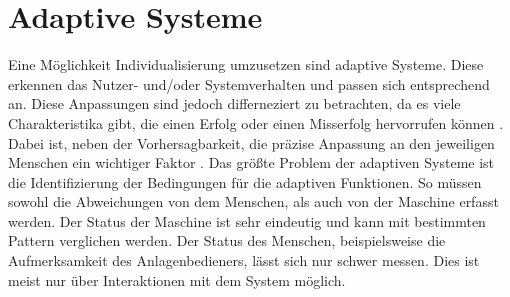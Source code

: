 \section{Adaptive Systeme}
\label{2:Adaptive-Systeme}
Eine Möglichkeit Individualisierung umzusetzen sind adaptive Systeme. Diese erkennen das Nutzer- und/oder Systemverhalten und passen sich entsprechend an. Diese Anpassungen sind jedoch differneziert zu betrachten, da es viele Charakteristika gibt, die einen Erfolg oder einen Misserfolg hervorrufen können \cite{Gajos2008}. Dabei ist, neben der Vorhersagbarkeit, die präzise Anpassung an den jeweiligen Menschen ein wichtiger Faktor \cite{Gajos2008}. Das größte Problem der adaptiven Systeme ist die Identifizierung der Bedingungen für die adaptiven Funktionen. So müssen sowohl die Abweichungen von dem Menschen, als auch von der Maschine erfasst werden. Der Status der Maschine ist sehr eindeutig und kann mit bestimmten Pattern verglichen werden. Der Status des Menschen, beispielsweise die Aufmerksamkeit des Anlagenbedieners, lässt sich nur schwer messen. Dies ist meist nur über Interaktionen mit dem System möglich. \cite{Viano2000}

